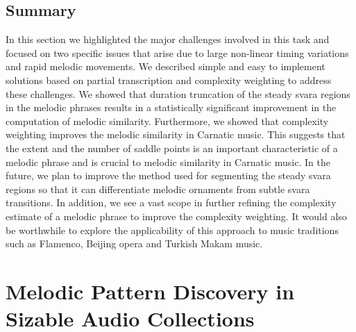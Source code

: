 \subsection{Summary}
\label{sec:patterns_improving_similarity_summary}

In this section we highlighted the major challenges involved in this task and focused on two specific issues that arise due to large non-linear timing variations and rapid melodic movements. We described simple and easy to implement solutions based on partial transcription and complexity weighting to address these challenges. We showed that duration truncation of the steady \gls{svara} regions in the melodic phrases results in a statistically significant improvement in the computation of melodic similarity. Furthermore, we showed that complexity weighting improves the melodic similarity in Carnatic music. This suggests that the extent and the number of saddle points is an important characteristic of a melodic phrase and is crucial to melodic similarity in Carnatic music.  In the future, we plan to improve the method used for segmenting the steady \gls{svara} regions so that it can differentiate melodic ornaments from subtle \gls{svara} transitions. In addition, we see a vast scope in further refining the complexity estimate of a melodic phrase to improve the complexity weighting. It would also be worthwhile to explore the applicability of this approach to music traditions such as Flamenco, Beijing opera and Turkish Makam music.





\section{Melodic Pattern Discovery in Sizable Audio Collections}
\label{sec:patterns_melodic_pattern_discovery}

